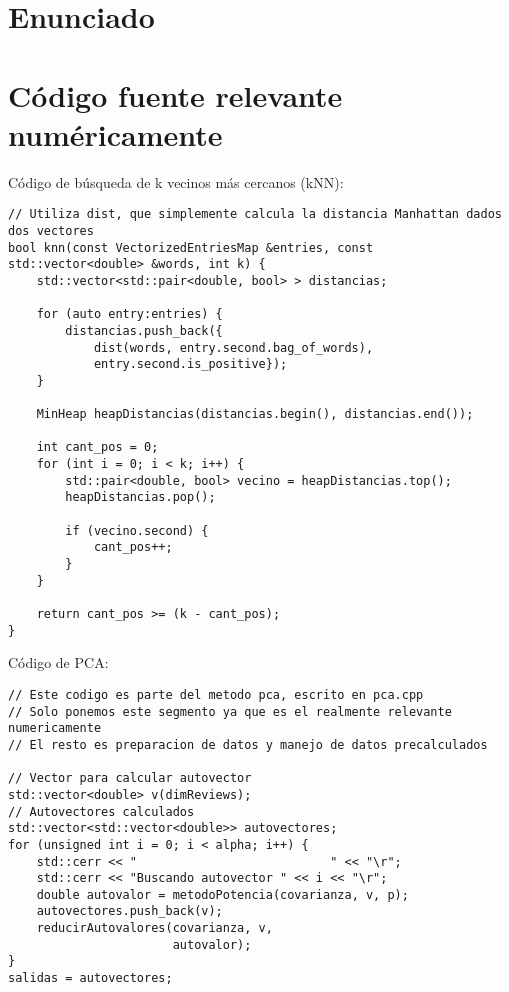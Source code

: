 \appendix

\section{Enunciado}
\label{ap:enunciado}


\section{Código fuente relevante numéricamente}

Código de búsqueda de k vecinos más cercanos (kNN):
\begin{lstlisting}
// Utiliza dist, que simplemente calcula la distancia Manhattan dados dos vectores
bool knn(const VectorizedEntriesMap &entries, const std::vector<double> &words, int k) {
    std::vector<std::pair<double, bool> > distancias;

    for (auto entry:entries) {
        distancias.push_back({
            dist(words, entry.second.bag_of_words),
            entry.second.is_positive});
    }

    MinHeap heapDistancias(distancias.begin(), distancias.end());

    int cant_pos = 0;
    for (int i = 0; i < k; i++) {
        std::pair<double, bool> vecino = heapDistancias.top();
        heapDistancias.pop();

        if (vecino.second) {
            cant_pos++;
        }
    }

    return cant_pos >= (k - cant_pos);
}
\end{lstlisting}

Código de PCA:
\begin{lstlisting}
// Este codigo es parte del metodo pca, escrito en pca.cpp
// Solo ponemos este segmento ya que es el realmente relevante numericamente
// El resto es preparacion de datos y manejo de datos precalculados

// Vector para calcular autovector
std::vector<double> v(dimReviews);
// Autovectores calculados
std::vector<std::vector<double>> autovectores;
for (unsigned int i = 0; i < alpha; i++) {
    std::cerr << "                           " << "\r";
    std::cerr << "Buscando autovector " << i << "\r";
    double autovalor = metodoPotencia(covarianza, v, p);
    autovectores.push_back(v);
    reducirAutovalores(covarianza, v,
                       autovalor);
}
salidas = autovectores;
\end{lstlisting}

